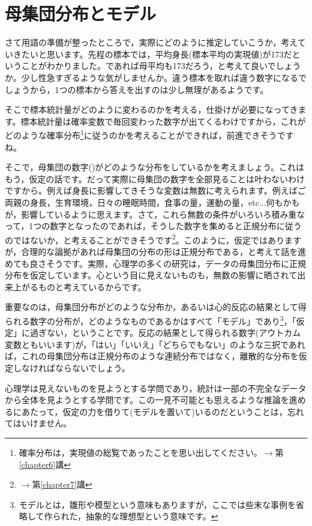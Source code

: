 \documentclass{ltjsbook}
\begin{document}
\section{母集団分布とモデル}
さて用語の準備が整ったところで，実際にどのように推定していこうか，考えていきたいと思います。先程の標本では，平均身長(標本平均の実現値)が173だということがわかりました。であれば母平均も173だろう，と考えて良いでしょうか。少し性急すぎるような気がしませんか。違う標本を取れば違う数字になるでしょうから，1つの標本から答えを出すのは少し無理があるようです。

そこで標本統計量がどのように変わるのかを考える，仕掛けが必要になってきます。標本統計量は確率変数で毎回変わった数字が出てくるわけですから，これがどのような確率分布\footnote{確率分布は，実現値の総覧であったことを思い出してください。$\to$第\ref{chapter6}講}に従うのかを考えることができれば，前進できそうですね。

そこで，母集団の数字()がどのような分布をしているかを考えましょう。これはもう，仮定の話です。だって実際に母集団の数字を全部見ることは叶わないわけですから。例えば身長に影響してきそうな変数は無数に考えられます。例えばご両親の身長，生育環境，日々の睡眠時間，食事の量，運動の量，etc...何もかもが，影響しているように思えます。さて，これら無数の条件がいろいろ積み重なって，1つの数字となったのであれば，そうした数字を集めると正規分布に従うのではないか，と考えることができそうです\footnote{$\to$第\ref{chapter7}講}。このように，仮定ではありますが，合理的な論拠があれば母集団の分布の形は正規分布である，と考えて話を進めても良さそうです。実際，心理学の多くの研究は，データの母集団分布に正規分布を仮定しています。心という目に見えないものも，無数の影響に晒されて出来上がるものと考えているからです。

重要なのは，母集団分布がどのような分布か，あるいは心的反応の結果として得られる数字の分布が，どのようなものであるかはすべて「モデル」であり\footnote{モデルとは，雛形や模型という意味もありますが，ここでは些末な事例を省略して作られた，抽象的な理想型という意味です。}，「仮定」に過ぎない，ということです。反応の結果として得られる数字(アウトカム変数ともいいます)が，「はい」「いいえ」「どちらでもない」のような三択であれば，これの母集団分布は正規分布のような連続分布ではなく，離散的な分布を仮定しなければならないでしょう。

心理学は見えないものを見ようとする学問であり，統計は一部の不完全なデータから全体を見ようとする学問です。この一見不可能とも思えるような推論を進めるにあたって，仮定の力を借りて(モデルを置いて)いるのだということは，忘れてはいけません。
\end{document}
